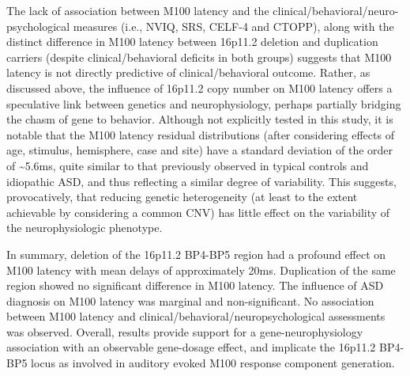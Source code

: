 \documentclass[]{article}
\begin{document}
\medskip

The lack of association between M100 latency and the
clinical/behavioral/neuro-psychological measures (i.e., NVIQ, SRS,
CELF-4 and CTOPP), along with the distinct difference in M100 latency
between 16p11.2 deletion and duplication carriers (despite
clinical/behavioral deficits in both groups) suggests that M100 latency
is not directly predictive of clinical/behavioral outcome. Rather, as
discussed above, the influence of 16p11.2 copy number on M100 latency
offers a speculative link between genetics and neurophysiology, perhaps
partially bridging the chasm of gene to behavior. Although not
explicitly tested in this study, it is notable that the M100 latency
residual distributions (after considering effects of age, stimulus,
hemisphere, case and site) have a standard deviation of the order of
\textasciitilde{}5.6ms, quite similar to that previously observed in
typical controls and idiopathic ASD, and thus reflecting a similar
degree of variability. This suggests, provocatively, that reducing
genetic heterogeneity (at least to the extent achievable by considering
a common CNV) has little effect on the variability of the
neurophysiologic phenotype.

\medskip

In summary, deletion of the 16p11.2 BP4-BP5 region had a profound effect
on M100 latency with mean delays of approximately 20ms. Duplication of
the same region showed no significant difference in M100 latency. The
influence of ASD diagnosis on M100 latency was marginal and
non-significant. No association between M100 latency and
clinical/behavioral/neuropsychological assessments was observed.
Overall, results provide support for a gene-neurophysiology association
with an observable gene-dosage effect, and implicate the 16p11.2 BP4-BP5
locus as involved in auditory evoked M100 response component generation.
\end{document}
